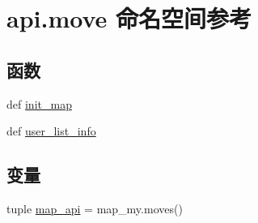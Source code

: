 \hypertarget{namespaceapi_1_1move}{\section{api.\-move 命名空间参考}
\label{namespaceapi_1_1move}
}
\subsection*{函数}
\begin{DoxyCompactItemize}
\item 
def \hyperlink{namespaceapi_1_1move_ac647c96dc5786189a7dc89b3d263b1f5}{init\-\_\-map}
\item 
def \hyperlink{namespaceapi_1_1move_a433cf9867f66a83760b0f3b3803ab6a7}{user\-\_\-list\-\_\-info}
\end{DoxyCompactItemize}
\subsection*{变量}
\begin{DoxyCompactItemize}
\item 
tuple \hyperlink{namespaceapi_1_1move_ac4655257e7da5f45ad12be2039492d27}{map\-\_\-api} = map\-\_\-my.\-moves()
\end{DoxyCompactItemize}


